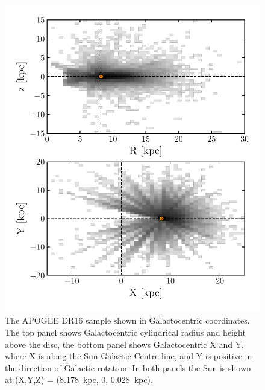 \begin{figure}
	\centering
	\includegraphics[width=\columnwidth]{figure/ch2/APOGEEGalactocentricRzXY.pdf}
	\caption{The APOGEE DR16 sample shown in Galactocentric coordinates. The top panel shows Galactocentric cylindrical radius and height above the disc, the bottom panel shows Galactocentric X and Y, where X is along the Sun-Galactic Centre line, and Y is positive in the direction of Galactic rotation. In both panels the Sun is shown at (X,Y,Z) = (8.178~kpc, 0, 0.028~kpc).}
	\label{fig:APOGEELocations}
\end{figure}

